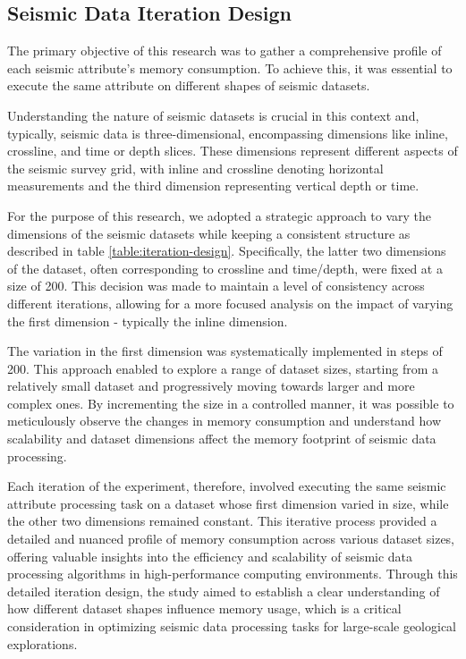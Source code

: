 \subsection{Seismic Data Iteration Design}

The primary objective of this research was to gather a comprehensive profile of each seismic attribute's memory consumption.
To achieve this, it was essential to execute the same attribute on different shapes of seismic datasets.

Understanding the nature of seismic datasets is crucial in this context and, typically, seismic data is three-dimensional, encompassing dimensions like inline, crossline, and time or depth slices.
These dimensions represent different aspects of the seismic survey grid, with inline and crossline denoting horizontal measurements and the third dimension representing vertical depth or time.

For the purpose of this research, we adopted a strategic approach to vary the dimensions of the seismic datasets while keeping a consistent structure as described in table \ref{table:iteration-design}.
Specifically, the latter two dimensions of the dataset, often corresponding to crossline and time/depth, were fixed at a size of 200.
This decision was made to maintain a level of consistency across different iterations, allowing for a more focused analysis on the impact of varying the first dimension - typically the inline dimension.

The variation in the first dimension was systematically implemented in steps of 200.
This approach enabled to explore a range of dataset sizes, starting from a relatively small dataset and progressively moving towards larger and more complex ones.
By incrementing the size in a controlled manner, it was possible to meticulously observe the changes in memory consumption and understand how scalability and dataset dimensions affect the memory footprint of seismic data processing.

Each iteration of the experiment, therefore, involved executing the same seismic attribute processing task on a dataset whose first dimension varied in size, while the other two dimensions remained constant.
This iterative process provided a detailed and nuanced profile of memory consumption across various dataset sizes, offering valuable insights into the efficiency and scalability of seismic data processing algorithms in high-performance computing environments.
Through this detailed iteration design, the study aimed to establish a clear understanding of how different dataset shapes influence memory usage, which is a critical consideration in optimizing seismic data processing tasks for large-scale geological explorations.

